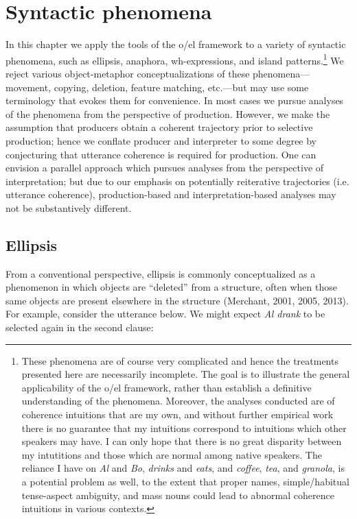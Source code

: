 \chapter{Syntactic phenomena}

In this chapter we apply the tools of the o/el framework to a variety of syntactic phenomena, such as ellipsis, anaphora, wh-expressions, and island patterns.\footnote{These phenomena are of course very complicated and hence the treatments presented here are necessarily incomplete. The goal is to illustrate the general applicability of the o/el framework, rather than establish a definitive understanding of the phenomena. Moreover, the analyses conducted are of coherence intuitions that are my own, and without further empirical work there is no guarantee that my intuitions correspond to intuitions which other speakers may have. I can only hope that there is no great disparity between my intutitions and those which are normal among native speakers. The reliance I have on \textit{Al} and \textit{Bo}, \textit{drinks} and \textit{eats}, and \textit{coffee}, \textit{tea}, and \textit{granola}, is a potential problem as well, to the extent that proper names, simple/habitual tense-aspect ambiguity, and mass nouns could lead to abnormal coherence intuitions in various contexts.} We reject various object-metaphor conceptualizations of these phenomena—movement, copying, deletion, feature matching, etc.—but may use some terminology that evokes them for convenience. In most cases we pursue analyses of the phenomena from the perspective of production. However, we make the assumption that producers obtain a coherent trajectory prior to selective production; hence we conflate producer and interpreter to some degree by conjecturing that utterance coherence is required for production. One can envision a parallel approach which pursues analyses from the perspective of interpretation; but due to our emphasis on potentially reiterative trajectories (i.e. utterance coherence), production-based and interpretation-based analyses may not be substantively different. 

\section{Ellipsis}

From a conventional perspective, ellipsis is commonly conceptualized as a phenomenon in which objects are “deleted” from a structure, often when those same objects are present elsewhere in the structure (Merchant, 2001, 2005, 2013). For example, consider the utterance below. We might expect \textit{Al drank} to be selected again in the second clause:


